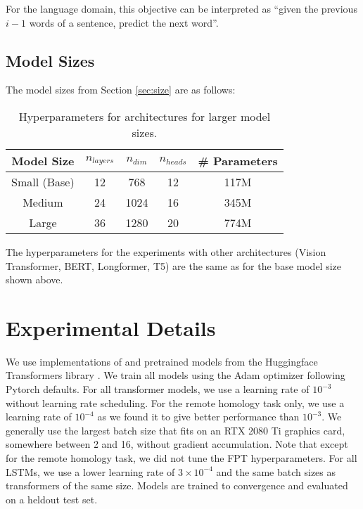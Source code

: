For the language domain, this objective can be interpreted as ``given the previous $i-1$ words of a sentence, predict the next word''.

\subsection{Model Sizes}

The model sizes from Section \ref{sec:size} are as follows:

\begin{table}[H] 
\begin{center}
\begin{tabular}{c|ccc|c}
\toprule
\textbf{Model Size} & $n_{layers}$ & $n_{dim}$ & $n_{heads}$ & \# Parameters \\
\midrule
Small (Base) & 12 & 768  & 12 & 117M \\
Medium       & 24 & 1024 & 16 & 345M \\
Large        & 36 & 1280 & 20 & 774M \\
\bottomrule
\end{tabular}
\end{center}
\caption{Hyperparameters for architectures for larger model sizes.}\label{table:model_sizes}
\end{table}

The hyperparameters for the experiments with other architectures (Vision Transformer, BERT, Longformer, T5) are the same as for the base model size shown above.

\section{Experimental Details}
\label{app:experimental_details}

We use implementations of and pretrained models from the Huggingface Transformers library \citep{wolf2020transformers}.
We train all models using the Adam \citep{kingma2014adam} optimizer following Pytorch \citep{paszke2019pytorch} defaults.
For all transformer models, we use a learning rate of $10^{-3}$ without learning rate scheduling.
For the remote homology task only, we use a learning rate of $10^{-4}$ as we found it to give better performance than $10^{-3}$.
We generally use the largest batch size that fits on an RTX 2080 Ti graphics card, somewhere between 2 and 16, without gradient accumulation.
Note that except for the remote homology task, we did not tune the FPT hyperparameters.
For all LSTMs, we use a lower learning rate of $3 \times 10^{-4}$ and the same batch sizes as transformers of the same size.
Models are trained to convergence and evaluated on a heldout test set.
\vspace{2em}

